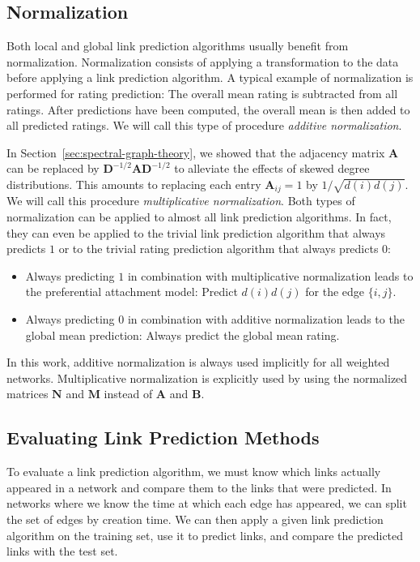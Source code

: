 \documentclass[11pt,a4paper]{book}
\begin{document}
\subsection{Normalization}
\label{sec:normalization}
Both local and global link prediction algorithms usually benefit from
normalization.  Normalization consists of applying a
transformation to the data before applying a link prediction
algorithm. 
A typical example of normalization is performed for
rating prediction:  The overall mean rating is subtracted from all
ratings.  After predictions have been computed, the overall mean is
then added to all predicted ratings.  We will call this type of
procedure \emph{additive normalization}.  

In Section~\ref{sec:spectral-graph-theory}, we showed that the
adjacency matrix $\mathbf 
A$ can be replaced by $\mathbf D^{-1/2}\mathbf A\mathbf
D^{-1/2}$ to alleviate the effects of skewed degree distributions. 
This amounts to replacing each entry $\mathbf A_{ij}=1$ by
$1/\sqrt{d(i)d(j)}$.  We will call this procedure \emph{multiplicative 
  normalization}. 
Both types of normalization can be applied to almost all link prediction
algorithms.  In fact, they can even be applied to the trivial link
prediction algorithm that always predicts $1$ or to the trivial rating
prediction algorithm that always predicts $0$:
\begin{itemize}
\item Always predicting $1$ in combination with multiplicative
  normalization leads to the preferential attachment model:  Predict
  $d(i)d(j)$ for the edge $\{i,j\}$.
\item Always predicting $0$ in combination with additive normalization
  leads to the global mean prediction:  Always predict the global mean
  rating. 
\end{itemize}

In this work, additive normalization is always used implicitly for all
weighted networks.  Multiplicative normalization is explicitly used by
using the normalized matrices $\mathbf N$ and $\mathbf M$ instead of
$\mathbf A$ and $\mathbf B$. 

\subsection{Evaluating Link Prediction Methods}
\label{sec:evaluation}
To evaluate a link prediction algorithm, we must know which links
actually appeared in a network and compare them to the links that were
predicted.  In networks where we know the time at which each edge has
appeared, we can split the set of edges by creation time.  We can then
apply a given link prediction algorithm on the training set, use it to
predict links, and compare the predicted links with the test set.
\end{document}
